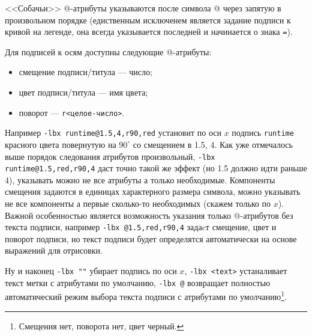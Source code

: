 \documentclass[12pt]{article}
\begin{document}
<<Собачьи>> @-атрибуты указываются после символа @ через запятую в произвольном порядке (едиственным исключенем является задание подписи к кривой на легенде,
она всегда указывается последней и начинается о знака \verb'='). 

Для подписей к осям доступны следующие @-атрибуты:
\begin{itemize}
\item смещение подписи/титула --- число;
\item цвет подписи/титула --- имя цвета;
\item поворот --- \verb'r<целое-число>'.
\end{itemize}
Например \verb'-lbx runtime@1.5,4,r90,red' установит по оси $x$ подпись \verb'runtime' красного цвета повернутую на $90^\circ$ со смещением в 1.5, 4.
Как уже отмечалось выше порядок следования атрибутов произвольный, \verb'-lbx runtime@1.5,red,r90,4' даст точно такой же эффект (но 1.5 должно идти раньше 4),
указывать можно не все атрибуты а только необходимые. 
Компоненты смещения задаются в единицах характерного размера символа, можно указывать не все компоненты а первые сколько-то необходимых (скажем только по $x$).
Важной особенностью является возможность указания только @-атрибутов без текста подписи, например \verb'-lbx @1.5,red,r90,4' задаcт смещение, цвет и поворот
подписи, но текст подписи будет определятся автоматически на основе выражений для отрисовки.

Ну и наконец \verb'-lbx ""' убирает подпись по оси $x$, \verb'-lbx <text>' устаналивает текст метки с атрибутами по умолчанию, 
\verb'-lbx @' возвращает полностью автоматический режим выбора текста подписи с атрибутами по умолчанию\footnote{Смещения нет, поворота нет, цвет черный.}.
\end{document}
